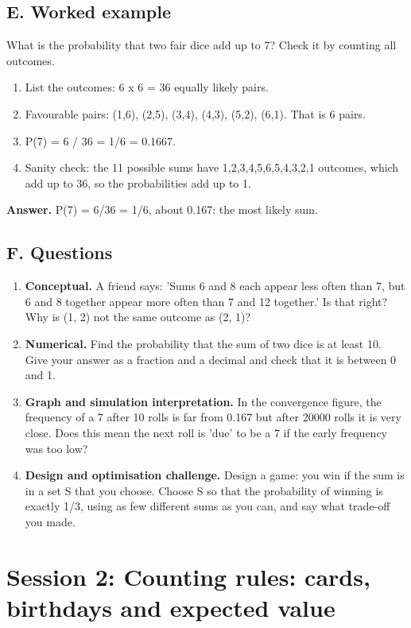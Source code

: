 \documentclass[11pt,a4paper]{article}
\begin{document}
\subsection*{E. Worked example}
What is the probability that two fair dice add up to 7? Check it by counting all outcomes.
\begin{enumerate}[nosep]
\item List the outcomes: 6 x 6 = 36 equally likely pairs.
\item Favourable pairs: (1,6), (2,5), (3,4), (4,3), (5,2), (6,1). That is 6 pairs.
\item P(7) = 6 / 36 = 1/6 = 0.1667.
\item Sanity check: the 11 possible sums have 1,2,3,4,5,6,5,4,3,2,1 outcomes, which add up to 36, so the probabilities add up to 1.
\end{enumerate}
\textbf{Answer.} P(7) = 6/36 = 1/6, about 0.167: the most likely sum.

\subsection*{F. Questions}
\begin{enumerate}[nosep]
\item \textbf{Conceptual.} A friend says: 'Sums 6 and 8 each appear less often than 7, but 6 and 8 together appear more often than 7 and 12 together.' Is that right? Why is (1, 2) not the same outcome as (2, 1)?
\item \textbf{Numerical.} Find the probability that the sum of two dice is at least 10. Give your answer as a fraction and a decimal and check that it is between 0 and 1.
\item \textbf{Graph and simulation interpretation.} In the convergence figure, the frequency of a 7 after 10 rolls is far from 0.167 but after 20000 rolls it is very close. Does this mean the next roll is 'due' to be a 7 if the early frequency was too low?
\item \textbf{Design and optimisation challenge.} Design a game: you win if the sum is in a set S that you choose. Choose S so that the probability of winning is exactly 1/3, using as few different sums as you can, and say what trade-off you made.
\end{enumerate}

\section{Session 2: Counting rules: cards, birthdays and expected value}
\end{document}
